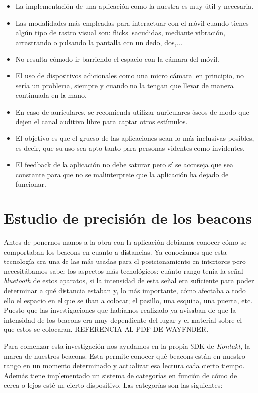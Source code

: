 \begin{itemize}
	\item La implementación de una aplicación como la nuestra es muy útil y necesaria.
	\item Las modalidades más empleadas para interactuar con el móvil cuando tienes algún tipo de rastro visual son: flicks, sacudidas, mediante vibración, arrastrando o pulsando la pantalla con un dedo, dos,...
	\item No resulta cómodo ir barriendo el espacio con la cámara del móvil.
	\item El uso de dispositivos adicionales como una micro cámara, en principio, no sería un problema, siempre y cuando no la tengan que llevar de manera continuada en la mano.
	\item En caso de auriculares, se recomienda utilizar auriculares óseos de modo que dejen el canal auditivo libre para captar otros estímulos.
	\item El objetivo es que el grueso de las aplicaciones sean lo más inclusivas posibles, es decir, que su uso sea apto tanto para personas videntes como invidentes.
	\item El feedback de la aplicación no debe saturar pero sí se aconseja que sea constante para que no se malinterprete que la aplicación ha dejado de funcionar.
\end{itemize}


\section{Estudio de precisión de los beacons}

Antes de ponernos manos a la obra con la aplicación debíamos conocer cómo se comportaban los beacons en cuanto a distancias. Ya conocíamos que esta tecnología era una de las más usadas para el posicionamiento en interiores pero necesitábamos saber los aspectos más tecnológicos: cuánto rango tenía la señal \textit{bluetooth} de estos aparatos, si la intensidad de esta señal era suficiente para poder determinar a qué distancia estaban y, lo más importante, cómo afectaba a todo ello el espacio en el que se iban a colocar; el pasillo, una esquina, una puerta, etc. Puesto que las investigaciones que habíamos realizado ya avisaban de que la intensidad de los beacons era muy dependiente del lugar y el material sobre el que estos se colocaran. REFERENCIA AL PDF DE WAYFNDER.

Para comenzar esta investigación nos ayudamos en la propia SDK de \textit{Kontakt}, la marca de nuestros beacons. Esta permite conocer qué beacons están en nuestro rango en un momento determinado y actualizar esa lectura cada cierto tiempo. Además tiene implementado un sistema de categorías en función de cómo de cerca o lejos esté un cierto dispositivo. Las categorías son las siguientes:

